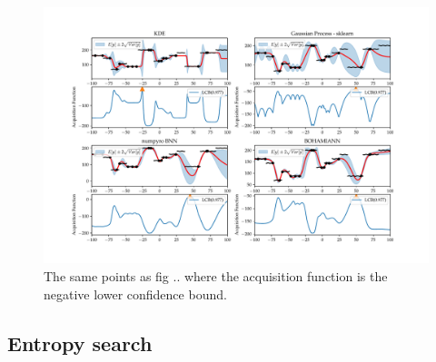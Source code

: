 \begin{figure}
    \centering
    \includegraphics[width=\textwidth]{Pictures/4_methods_LCB_000.pdf}
    \caption{The same points as fig .. where the acquisition function is the
    negative lower confidence bound. }
\end{figure}


\subsection{Entropy search}






